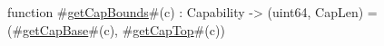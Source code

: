 function #\hyperref[zgetCapBounds]{getCapBounds}#(c) : Capability -> (uint64, CapLen) =
  (#\hyperref[zgetCapBase]{getCapBase}#(c), #\hyperref[zgetCapTop]{getCapTop}#(c))
